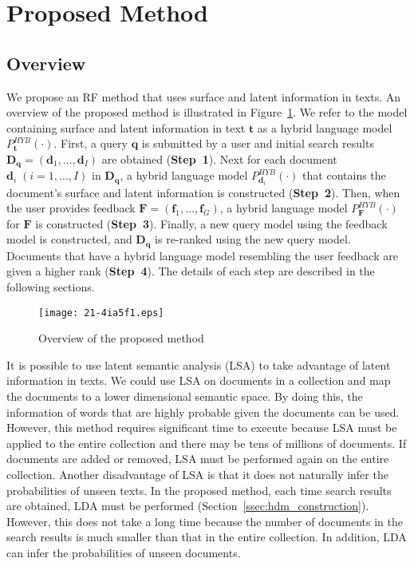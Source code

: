 \documentclass[english]{jnlp_1.4_rep}
\begin{document}
\section{Proposed Method}
\label{sec:mthd}

\subsection{Overview}

We propose an RF method that uses surface and latent information in
texts. An overview of the proposed method is illustrated in
Figure~\ref{fig:proposed_method}. We refer to the model containing
surface and latent information in text $\bm{t}$ as a hybrid language
model $P^{HYB}_{\bm{t}}(\cdot)$. First, a query $\bm{q}$ is submitted by
a user and initial search results $\bm{D}_{\bm{q}} = (\bm{d}_{1}, \dots,
\bm{d}_{I})$ are obtained (\textbf{Step~1}). Next for each document
$\bm{d}_{i} \; (i = 1, \dots, I)$ in $\bm{D}_{\bm{q}}$, a hybrid
language model $P_{\bm{d}_{i}}^{HYB}(\cdot)$ that contains the
document's surface and latent information is constructed
(\textbf{Step~2}). Then, when the user provides feedback $\bm{F} =
(\bm{f}_{1}, \dots, \bm{f}_{G})$, a hybrid language model
$P_{\bm{F}}^{HYB}(\cdot)$ for $\bm{F}$ is constructed
(\textbf{Step~3}). Finally, a new query model using the feedback model
is constructed, and $\bm{D}_{\bm{q}}$ is re-ranked using the new query
model. Documents that have a hybrid language model resembling the user
feedback are given a higher rank (\textbf{Step~4}). The details of each
step are described in the following sections.

\begin{figure}[t]
 \begin{center}
  \texttt{[image: 21-4ia5f1.eps]}
 \end{center}
  \caption{Overview of the proposed method}
\label{fig:proposed_method}
\end{figure}

It is possible to use latent semantic analysis (LSA) to take advantage
of latent information in texts. We could use LSA on documents in a
collection and map the documents to a lower dimensional semantic
space. By doing this, the information of words that are highly probable
given the documents can be used. However, this method requires
significant time to execute because LSA must be applied to the entire
collection and there may be tens of millions of documents. If documents
are added or removed, LSA must be performed again on the entire
collection. Another disadvantage of LSA is that it does not naturally
infer the probabilities of unseen texts. In the proposed method, each
time search results are obtained, LDA must be performed
(Section~\ref{ssec:hdm_construction}). However, this does not take a
long time because the number of documents in the search results is much
smaller than that in the entire collection. In addition, LDA can infer
the probabilities of unseen documents.
\end{document}
